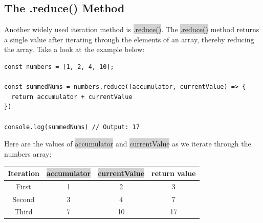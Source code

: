 \documentclass[11pt]{article}
\begin{document}
\subsection{The .reduce() Method}
Another widely used iteration method is \colorbox{lightgray}{.reduce()}. The \colorbox{lightgray}{.reduce()} method returns a single value after iterating through the elements of an array, thereby reducing the array. Take a look at the example below:
\begin{lstlisting}
const numbers = [1, 2, 4, 10];

const summedNums = numbers.reduce((accumulator, currentValue) => {
  return accumulator + currentValue
})

console.log(summedNums) // Output: 17
\end{lstlisting}
Here are the values of \colorbox{lightgray}{accumulator} and \colorbox{lightgray}{currentValue} as we iterate through the numbers array:
\begin{center}
\begin{tabular}[H]{ |c|c|c|c| } 
 \hline
 Iteration & \colorbox{lightgray}{accumulator} & \colorbox{lightgray}{currentValue} & return value \\ 
 \hline
 First & 1 & 2 & 3 \\ 
 \hline
 Second & 3 & 4 & 7\\ 
 \hline
 Third & 7 & 10 & 17\\
 \hline
\end{tabular}
\end{center}
\end{document}

